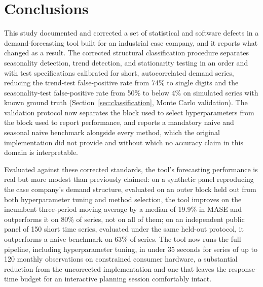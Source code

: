 \documentclass[forecasting,article,submit,pdftex,moreauthors]{Definitions/mdpi}
\begin{document}
\section{Conclusions}
\label{sec:conclusions}

This study documented and corrected a set of statistical and software defects in a demand-forecasting tool built for an industrial case company, and it reports what changed as a result. The corrected structural classification procedure separates seasonality detection, trend detection, and stationarity testing in an order and with test specifications calibrated for short, autocorrelated demand series, reducing the trend-test false-positive rate from 74\% to single digits and the seasonality-test false-positive rate from 50\% to below 4\% on simulated series with known ground truth (Section~\ref{sec:classification}, Monte Carlo validation). The validation protocol now separates the block used to select hyperparameters from the block used to report performance, and reports a mandatory naive and seasonal naive benchmark alongside every method, which the original implementation did not provide and without which no accuracy claim in this domain is interpretable.

Evaluated against these corrected standards, the tool's forecasting performance is real but more modest than previously claimed: on a synthetic panel reproducing the case company's demand structure, evaluated on an outer block held out from both hyperparameter tuning and method selection, the tool improves on the incumbent three-period moving average by a median of 19.9\% in MASE and outperforms it on 80\% of series, not on all of them; on an independent public panel of 150 short time series, evaluated under the same held-out protocol, it outperforms a naive benchmark on 63\% of series. The tool now runs the full pipeline, including hyperparameter tuning, in under 35 seconds for series of up to 120 monthly observations on constrained consumer hardware, a substantial reduction from the uncorrected implementation and one that leaves the response-time budget for an interactive planning session comfortably intact.
\end{document}
